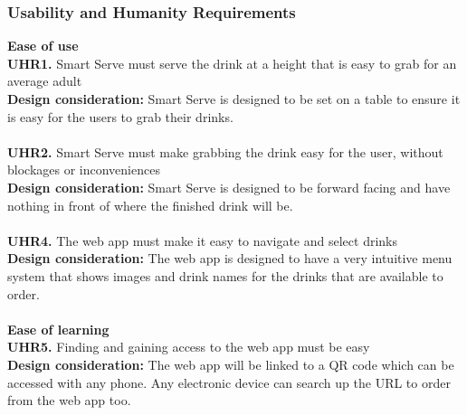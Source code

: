 \documentclass[12pt, titlepage]{article}
\begin{document}
\subsubsection{Usability and Humanity Requirements}
    \textbf{Ease of use}\\
        \noindent\textbf{UHR1.} Smart Serve must serve the drink at a height that is easy to grab for an average adult \\
        \indent\textbf{Design consideration:} Smart Serve is designed to be set on a table to ensure it is easy for the users to grab their drinks.\\\\
        \textbf{UHR2.} Smart Serve must make grabbing the drink easy for the user, without blockages or inconveniences\\
        \indent\textbf{Design consideration:} Smart Serve is designed to be forward facing and have nothing in front of where the finished drink will be.\\\\
        \textbf{UHR4.} The web app must make it easy to navigate and select drinks\\
        \indent\textbf{Design consideration:} The web app is designed to have a very intuitive menu system that shows images and drink names for the drinks that are available to order.\\\\
    \textbf{Ease of learning}\\
        \noindent\textbf{UHR5.} Finding and gaining access to the web app must be easy \\
        \indent\textbf{Design consideration:} The web app will be linked to a QR code which can be accessed with any phone. Any electronic device can search up the URL to order from the web app too.
\end{document}
